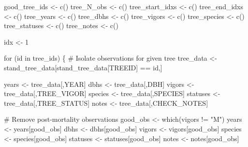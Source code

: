 \documentclass[
  letterpaper,
  DIV=11,
  numbers=noendperiod]{scrartcl}
\newenvironment{Shaded}{\begin{snugshade}}{\end{snugshade}}
\newcommand{\CommentTok}[1]{\textcolor[rgb]{0.37,0.37,0.37}{#1}}
\newcommand{\ControlFlowTok}[1]{\textcolor[rgb]{0.00,0.23,0.31}{#1}}
\newcommand{\DecValTok}[1]{\textcolor[rgb]{0.68,0.00,0.00}{#1}}
\newcommand{\FunctionTok}[1]{\textcolor[rgb]{0.28,0.35,0.67}{#1}}
\newcommand{\NormalTok}[1]{\textcolor[rgb]{0.00,0.23,0.31}{#1}}
\newcommand{\OtherTok}[1]{\textcolor[rgb]{0.00,0.23,0.31}{#1}}
\newcommand{\SpecialCharTok}[1]{\textcolor[rgb]{0.37,0.37,0.37}{#1}}
\newcommand{\StringTok}[1]{\textcolor[rgb]{0.13,0.47,0.30}{#1}}
\begin{document}
\begin{Shaded}
\begin{Highlighting}[]
\NormalTok{good\_tree\_ids }\OtherTok{\textless{}{-}} \FunctionTok{c}\NormalTok{()}
\NormalTok{tree\_N\_obs }\OtherTok{\textless{}{-}} \FunctionTok{c}\NormalTok{()}
\NormalTok{tree\_start\_idxs }\OtherTok{\textless{}{-}} \FunctionTok{c}\NormalTok{()}
\NormalTok{tree\_end\_idxs }\OtherTok{\textless{}{-}} \FunctionTok{c}\NormalTok{()}
\NormalTok{tree\_years }\OtherTok{\textless{}{-}} \FunctionTok{c}\NormalTok{()}
\NormalTok{tree\_dbhs }\OtherTok{\textless{}{-}} \FunctionTok{c}\NormalTok{()}
\NormalTok{tree\_vigors }\OtherTok{\textless{}{-}} \FunctionTok{c}\NormalTok{()}
\NormalTok{tree\_species }\OtherTok{\textless{}{-}} \FunctionTok{c}\NormalTok{()}
\NormalTok{tree\_statuses }\OtherTok{\textless{}{-}} \FunctionTok{c}\NormalTok{()}
\NormalTok{tree\_notes }\OtherTok{\textless{}{-}} \FunctionTok{c}\NormalTok{()}

\NormalTok{idx }\OtherTok{\textless{}{-}} \DecValTok{1}

\ControlFlowTok{for}\NormalTok{ (id }\ControlFlowTok{in}\NormalTok{ tree\_ids) \{}
  \CommentTok{\# Isolate observations for given tree}
\NormalTok{  tree\_data }\OtherTok{\textless{}{-}}\NormalTok{ stand\_tree\_data[stand\_tree\_data[}\StringTok{\textquotesingle{}TREEID\textquotesingle{}}\NormalTok{] }\SpecialCharTok{==}\NormalTok{ id,]}

\NormalTok{  years }\OtherTok{\textless{}{-}}\NormalTok{ tree\_data[,}\StringTok{\textquotesingle{}YEAR\textquotesingle{}}\NormalTok{]}
\NormalTok{  dbhs }\OtherTok{\textless{}{-}}\NormalTok{ tree\_data[,}\StringTok{\textquotesingle{}DBH\textquotesingle{}}\NormalTok{]}
\NormalTok{  vigors }\OtherTok{\textless{}{-}}\NormalTok{ tree\_data[,}\StringTok{\textquotesingle{}TREE\_VIGOR\textquotesingle{}}\NormalTok{]}
\NormalTok{  species }\OtherTok{\textless{}{-}}\NormalTok{ tree\_data[,}\StringTok{\textquotesingle{}SPECIES\textquotesingle{}}\NormalTok{]}
\NormalTok{  statuses }\OtherTok{\textless{}{-}}\NormalTok{ tree\_data[,}\StringTok{\textquotesingle{}TREE\_STATUS\textquotesingle{}}\NormalTok{]}
\NormalTok{  notes }\OtherTok{\textless{}{-}}\NormalTok{ tree\_data[,}\StringTok{\textquotesingle{}CHECK\_NOTES\textquotesingle{}}\NormalTok{]}

  \CommentTok{\# Remove post{-}mortality observations}
\NormalTok{  good\_obs }\OtherTok{\textless{}{-}} \FunctionTok{which}\NormalTok{(vigors }\SpecialCharTok{!=} \StringTok{"M"}\NormalTok{)}
\NormalTok{  years }\OtherTok{\textless{}{-}}\NormalTok{ years[good\_obs]}
\NormalTok{  dbhs }\OtherTok{\textless{}{-}}\NormalTok{ dbhs[good\_obs]}
\NormalTok{  vigors }\OtherTok{\textless{}{-}}\NormalTok{ vigors[good\_obs]}
\NormalTok{  species }\OtherTok{\textless{}{-}}\NormalTok{ species[good\_obs]}
\NormalTok{  statuses }\OtherTok{\textless{}{-}}\NormalTok{ statuses[good\_obs]}
\NormalTok{  notes }\OtherTok{\textless{}{-}}\NormalTok{ notes[good\_obs]}


\end{Highlighting}
\end{Shaded}
\end{document}
